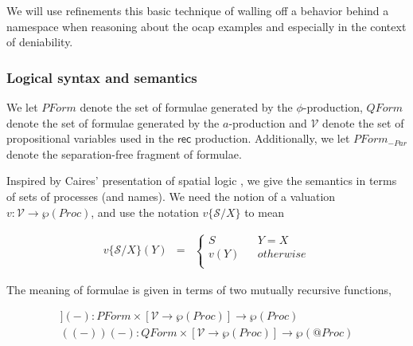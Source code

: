 \documentclass[submission,copyright,creativecommons]{eptcs}
\makeatletter
\newcommand{\ldb}{[\![}
\newcommand{\rdb}{]\!]}
\newcommand{\ldrb}{(\!(}
\newcommand{\rdrb}{)\!)}
\newcommand{\lpquote}{\ulcorner}
\newcommand{\rpquote}{\urcorner}
\newcommand{\id}[1]{\texttt{#1}}
\newcommand{\pzero}{\mathbin{0}}
\newcommand{\juxtap}{\mathbin{\id{|}}}
\newcommand{\quotep}[1]{@#1}
\newcommand{\substn}[2]{\id{\{} #1 / #2 \id{\}}}
\newcommand{\pmeaningof}[1]{\ldb #1 \rdb}
\newcommand{\nmeaningof}[1]{\ldrb #1 \rdrb}
\newcommand{\Proc}{\mathbin{Proc}}
\newcommand{\QProc}{\quotep{\mathbin{Proc}}}
\newcommand{\ptrue}{\mathbin{true}}
\newcommand{\pdropf}[1]{\rpquote #1 \lpquote}
\newcommand{\pquotep}[1]{\lpquote #1 \rpquote}
\newcommand{\plift}[2]{#1 ! ( #2 )}
\newcommand{\pprefix}[3]{\langle #1 ? #2 \rangle #3}
\newcommand{\pgfp}[2]{\textsf{rec} \; #1 \mathbin{.} #2}
\newcommand{\pquant}[3]{\forall #1 \mathbin{:} #2 \mathbin{.} #3}
\newcommand{\PFormula}{\mathbin{PForm}}
\newcommand{\QFormula}{\mathbin{QForm}}
\newcommand{\PropVar}{\mathbin{\mathcal{V}}}
\newcommand{\bc}{\mathbin{\mathbf{::=}}}
\numberwithin{equation}{subsection}
\makeatother
\begin{document}
We will use refinements this basic technique of walling off a behavior
behind a namespace when reasoning about the ocap examples and
especially in the context of deniability.

\subsubsection{Logical syntax and semantics}


We let $\PFormula$ denote the set of formulae generated by the
$\phi$-production, $\QFormula$ denote the set of formulae generated by
the $a$-production and $\PropVar$ denote the set of propositional
variables used in the $\textsf{rec}$ production. Additionally, we let
$\PFormula_{-Par}$ denote the separation-free fragment of formulae.

Inspired by Caires' presentation of spatial logic
\cite{DBLP:conf/fossacs/Caires04}, we give the semantics in terms of
sets of processes (and names). We need the notion of a valuation $v :
\PropVar \to \wp(\Proc)$, and use the notation $v\substn{\mathcal{S}}{X}$ to mean 

\begin{eqnarray}
  v\substn{\mathcal{S}}{X}(Y) & = &
  \left\{ \begin{array}{ccc}
      S & & Y = X \\
      v(Y) & & otherwise \\
    \end{array}
  \right.\nonumber
\end{eqnarray}

The meaning of formulae is given in terms of two mutually recursive functions,

\begin{eqnarray}
\pmeaningof{ - }( - ) : \PFormula \times [\PropVar \to \wp(\Proc)] \to \wp(\Proc) \nonumber\\
\nmeaningof{ - }( - ) : \QFormula \times [\PropVar \to \wp(\Proc)] \to \wp(\QProc) \nonumber
\end{eqnarray}
\end{document}
